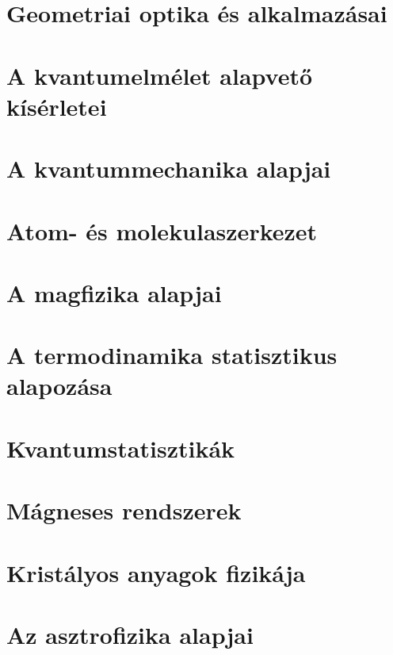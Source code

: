 \documentclass[a4paper,12pt]{article}
\begin{document}
\newpage
\section{Geometriai optika és alkalmazásai}


\newpage
\section{A kvantumelmélet alapvető kísérletei \cite{kiserleti_atomfizika}}


\newpage
\section{A kvantummechanika alapjai \cite{quantum_intro}}


\newpage
\section{Atom- és molekulaszerkezet \cite{quantum_intro}}


\newpage
\section{A magfizika alapjai \cite{atommag_fizika}}


\newpage
\section{A termodinamika statisztikus alapozása\cite{stat_fiz}}


\newpage
\section{Kvantumstatisztikák\cite{stat_fiz}}


\newpage
\section{Mágneses rendszerek\cite{solid_state}}


\newpage
\section{Kristályos anyagok fizikája\cite{solid_state}}


\newpage
\section{Az asztrofizika alapjai}


\newpage
\printbibliography[heading=bibintoc,title={Irodalomjegyzék}]
\end{document}
